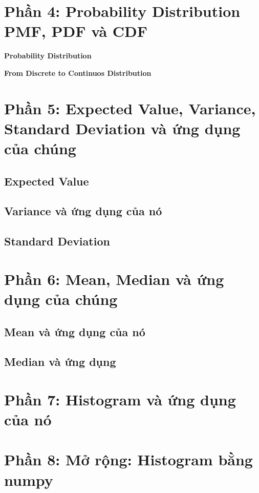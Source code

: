 \documentclass[11pt]{article}
\begin{document}
\section{Phần 4: Probability Distribution PMF, PDF và CDF}
\textbf{Probability Distribution}

\textbf{From Discrete to Continuos Distribution}



\section{Phần 5: Expected Value, Variance, Standard Deviation và ứng dụng của chúng}
\subsection{Expected Value}

\subsection{Variance và ứng dụng của nó}

\subsection{Standard Deviation}


\section{Phần 6: Mean, Median và ứng dụng của chúng}
\subsection{Mean và ứng dụng của nó}

\subsection{Median và ứng dụng}

\section{Phần 7: Histogram và ứng dụng của nó}

\section{Phần 8: Mở rộng: Histogram bằng numpy}
\end{document}
